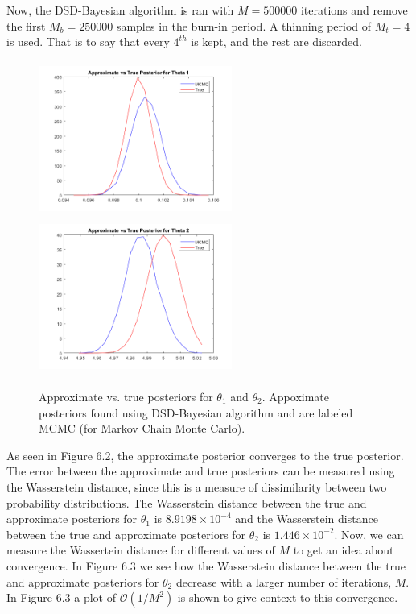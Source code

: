 \documentclass[botnum, fleqn]{unmeethesis}
\begin{document}
Now, the DSD-Bayesian algorithm is ran with $M=500000$ iterations and remove the first $M_b=250000$ samples in the burn-in period. A thinning period of $M_t=4$ is used. That is to say that every $4^{th}$ is kept, and the rest are discarded. 
\begin{figure}[H]
	\centering
	\includegraphics[width=2.5in,height=2in]{theta1.png}
	\includegraphics[width=2.5in,height=2in]{theta2.png}
	\caption{Approximate vs. true posteriors for $\theta_1$ and $\theta_2$. Appoximate posteriors found using DSD-Bayesian algorithm and are labeled MCMC (for Markov Chain Monte Carlo).}
\end{figure}
As seen in Figure 6.2, the approximate posterior converges to the true posterior. The error between the approximate and true posteriors can be measured using the Wasserstein distance, since this is a measure of dissimilarity between two probability distributions. The Wasserstein distance between the true and approximate posteriors for $\theta_1$ is $8.9198\times 10^{-4}$ and the Wasserstein distance between the true and approximate posteriors for $\theta_2$ is $1.446\times 10^{-2}$. Now, we can measure the Wassertein distance for different values of $M$ to get an idea about convergence. In Figure 6.3 we see how the Wasserstein distance between the true and approximate posteriors for $\theta_2$ decrease with a larger number of iterations, $M$. In Figure 6.3 a plot of $\mathcal{O}(1/M^2)$ is shown to give context to this convergence. \newpage
\end{document}
